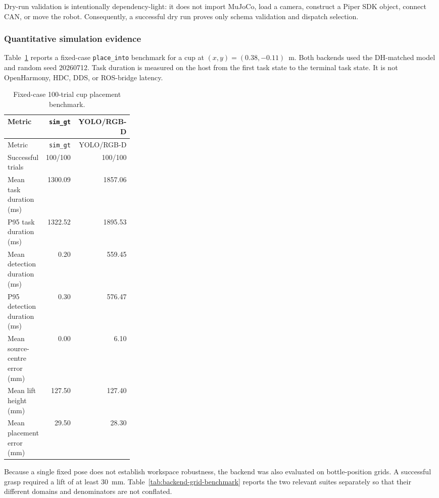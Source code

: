 Dry-run validation is intentionally dependency-light: it does not import
MuJoCo, load a camera, construct a Piper SDK object, connect CAN, or move the
robot. Consequently, a successful dry run proves only schema validation and
dispatch selection.

\subsubsection{Quantitative simulation evidence}

Table~\ref{tab:backend-fixed-benchmark} reports a fixed-case
\texttt{place\_into} benchmark for a cup at $(x,y)=(0.38,-0.11)$~m. Both
backends used the DH-matched model and random seed 20260712. Task duration is
measured on the host from the first task state to the terminal task state. It
is not OpenHarmony, HDC, DDS, or ROS-bridge latency.

\begin{longtable}{@{}
>{\raggedright\arraybackslash}p{0.29\linewidth}rr@{}}
\caption{Fixed-case 100-trial cup placement benchmark.}
\label{tab:backend-fixed-benchmark}\\
\toprule
Metric & \texttt{sim\_gt} & YOLO/RGB-D \\
\midrule
\endfirsthead
\toprule
Metric & \texttt{sim\_gt} & YOLO/RGB-D \\
\midrule
\endhead
\bottomrule
\endfoot
Successful trials & 100/100 & 100/100 \\
Mean task duration (ms) & 1300.09 & 1857.06 \\
P95 task duration (ms) & 1322.52 & 1895.53 \\
Mean detection duration (ms) & 0.20 & 559.45 \\
P95 detection duration (ms) & 0.30 & 576.47 \\
Mean source-centre error (mm) & 0.00 & 6.10 \\
Mean lift height (mm) & 127.50 & 127.40 \\
Mean placement error (mm) & 29.50 & 28.30 \\
\end{longtable}

Because a single fixed pose does not establish workspace robustness, the
backend was also evaluated on bottle-position grids. A successful grasp
required a lift of at least 30~mm. Table~\ref{tab:backend-grid-benchmark}
reports the two relevant suites separately so that their different domains
and denominators are not conflated.

